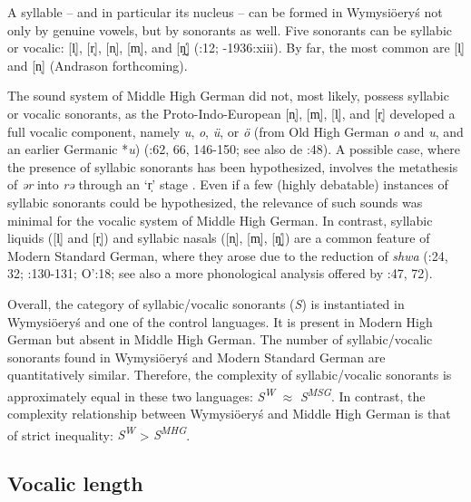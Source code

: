 \documentclass[output=paper]{langscibook}
\begin{document}
A syllable – and in particular its nucleus – can be formed in Wymysiöeryś not only by genuine vowels, but by sonorants as well. Five sonorants can be syllabic or vocalic: [l̩], [r̩], [n̩], [m̩], and [ŋ̬̍] (\citealt{Kleczkowski1920}:12; \citealt{Mojmir1930}-1936:xiii). By far, the most common are [l̩] and [n̩] (Andrason forthcoming). 



The sound system of Middle High German did not, most likely, possess syllabic or vocalic sonorants, as the Proto-Indo-European [n̩], [m̩], [l̩], and [r̩] developed a full vocalic component, namely \textit{u}, \textit{o}, \textit{ü}, or \textit{ö} (from Old High German \textit{o} and \textit{u}, and an earlier Germanic *\textit{u}) (\citealt{Paul2007}:62, 66, 146-150; see also de \citealt{BoorWisniewski1973}:48). A possible case, where the presence of syllabic sonorants has been hypothesized, involves the metathesis of \textit{ər} into \textit{rə} through an ‘r̩’ stage \citep[147]{Paul2007}. Even if a few (highly debatable) instances of syllabic sonorants could be hypothesized, the relevance of such sounds was minimal for the vocalic system of Middle High German. In contrast, syllabic liquids ([l̩] and [r̩]) and syllabic nasals ([n̩], [m̩], [ŋ̬̍]) are a common feature of Modern Standard German, where they arose due to the reduction of \textit{shwa} (\citealt{Fagan2009}:24, 32; \citealt{JohnsonBraber2008}:130-131; O’\citealt{BrienFagan2016}:18; see also a more phonological analysis offered by \citealt{Fox2005}:47, 72).



Overall, the category of syllabic/vocalic sonorants (\textit{S}) is instantiated in Wymysiöeryś and one of the control languages. It is present in Modern High German but absent in Middle High German. The number of syllabic/vocalic sonorants found in Wymysiöeryś and Modern Standard German are quantitatively similar. Therefore, the complexity of syllabic/vocalic sonorants is approximately equal in these two languages: \textit{S\textsuperscript{W}} ${\approx}$ \textit{S\textsuperscript{MSG}}. In contrast, the complexity relationship between Wymysiöeryś and Middle High German is that of strict inequality: \textit{S\textsuperscript{W}} > \textit{S\textsuperscript{MHG}}. 


\subsection{Vocalic length}\label{sec:wymsorys:3.5}
\end{document}
